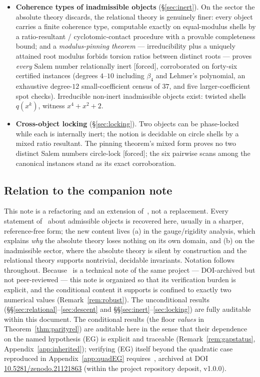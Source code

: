 \documentclass[11pt]{article}
\theoremstyle{plain}
\theoremstyle{definition}
\theoremstyle{remark}
\newcommand{\F}{\textnormal{[forced]}}
\begin{document}
\begin{itemize}
  absolute one: $\mu_{\mathrm{rel}}(m)=\varphi$ for even $m$ (attained), and
  $\mu_{\mathrm{rel}}(m)=\mu(m)$ for odd $m$. Identity and attainment \F;
  the floor \emph{values} are conditional per Remark~\ref{rem:gapstatus}
\item \textbf{Coherence types of inadmissible objects} (\S\ref{sec:inert}). On the
  sector the absolute theory discards, the relational theory is genuinely finer:
  every object carries a finite coherence type, computable exactly on
  equal-modulus shells by a ratio-resultant / cyclotomic-contact procedure
  with a provable completeness bound; and a \emph{modulus-pinning theorem}
  --- irreducibility plus a uniquely attained root modulus forbids torsion
  ratios between distinct roots --- proves \emph{every} Salem number
  relationally inert \F, corroborated on forty-six certified instances
  (degrees $4$--$10$ including $\beta_4$ and Lehmer's polynomial, an
  exhaustive degree-$12$ small-coefficient census of $37$, and five
  larger-coefficient spot checks). Irreducible non-inert inadmissible
  objects exist: twisted shells $q(x^k)$, witness $x^4+x^2+2$.
\item \textbf{Cross-object locking} (\S\ref{sec:locking}). Two objects can be
  phase-locked while each is internally inert; the notion is decidable on circle
  shells by a mixed ratio resultant. The pinning theorem's mixed form proves
  no two distinct Salem numbers circle-lock \F; the six pairwise scans among
  the canonical instances stand as its exact corroboration.
\end{itemize}

\subsection{Relation to the companion note}

This note is a refactoring and an extension of~\cite{CMC}, not a replacement. Every
statement of~\cite{CMC} about admissible objects is recovered here, usually in a
sharper, reference-free form; the new content lives (a) in the gauge/rigidity
analysis, which explains \emph{why} the absolute theory loses nothing on its own
domain, and (b) on the inadmissible sector, where the absolute theory is silent by
construction and the relational theory supports nontrivial, decidable invariants.
Notation follows~\cite{CMC} throughout. Because~\cite{CMC} is a technical note of the same project ---
DOI-archived but not peer-reviewed --- this note is organized so that its
verification burden is explicit, and the conditional content it supports is
confined to exactly two numerical values (Remark~\ref{rem:robust}). The unconditional
results (\S\S\ref{sec:relational}--\ref{sec:descent} and
\S\S\ref{sec:inert}--\ref{sec:locking}) are fully auditable within this
document. The conditional results (the floor \emph{values} in
Theorem~\ref{thm:parityrel}) are auditable here in the sense that their
dependence on the named hypothesis \textup{(EG)} is explicit and traceable
(Remark~\ref{rem:gapstatus}, Appendix~\ref{app:inherited}); verifying
\textup{(EG)} itself beyond the quadratic case reproduced in
Appendix~\ref{app:quadEG} requires~\cite{CMC}, archived at DOI \url{10.5281/zenodo.21121863}
(within the project repository deposit, v1.0.0).
\end{document}
